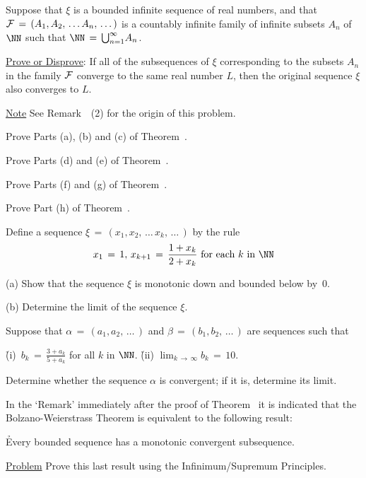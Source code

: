 \V
\V

\noindent \ExCn Suppose that ${\xi}$ is a bounded infinite sequence of real numbers, and that ${\cal F} \,=\, (A_{1},A_{2},\,{\ldots}\,A_{n},\,{\ldots}\,)$ is a countably infinite family of infinite subsets $A_{n}$ of ${\NN}$ such that ${\NN} \,=\, {\bigcup}_{n=1}^{{\infty}} A_{n}$.

        \underline{Prove or Disprove}: If all of the subsequences of ${\xi}$ corresponding to the subsets $A_{n}$ in the family ${\cal F}$ converge to the same real number $L$, then the original sequence ${\xi}$ also converges to $L$.

        \underline{Note} See Remark~~(2) for the origin of this problem.


\V
\V

\noindent \ExCo Prove Parts (a), (b) and (c) of Theorem~. %

\V
\V

\noindent \ExCp Prove Parts (d) and (e) of Theorem~. %

\V
\V

\noindent \ExCq Prove Parts (f) and (g) of Theorem~. %

\V
\V

\noindent \ExCr Prove Part (h) of Theorem~. %

\V
\V

\noindent \ExCs Define a sequence ${\xi} \,=\, (x_{1},x_{2},\,{\ldots}\,x_{k},\,{\ldots}\,)$ by the rule
        \begin{displaymath}
        x_{1} \,=\, 1, \, x_{k+1} \,=\, \frac{1+x_{k}}{2+x_{k}} \mbox{ for each $k$ in ${\NN}$}
        \end{displaymath}

\V

        (a) Show that the sequence ${\xi}$ is monotonic down and bounded below by~$0$.

\V

        (b) Determine the limit of the sequence ${\xi}$.


\V
\V

\noindent \ExCt Suppose that ${\alpha} \,=\, (a_{1},a_{2},\,{\ldots}\,)$ and ${\beta} \,=\, (b_{1},b_{2},\,{\ldots}\,)$ are sequences such that

        \h (i)\, $b_{k} \,=\, {\displaystyle \frac{3+a_{k}}{5+a_{k}}}$ for all $k$ in ${\NN}$.
        \h (ii) $\lim_{k \,{\rightarrow}\, {\infty}} b_{k} \,=\, 10$.

\noindent Determine whether the sequence ${\alpha}$ is convergent; if it is, determine its limit.

\V
\V


\noindent \ExCu In the `Remark' immediately after the proof of Theorem~ %
    it is indicated that the Bolzano-Weierstrass Theorem is equivalent to the following result:

        \h  Every bounded sequence has a monotonic convergent subsequence.

        \underline{Problem} Prove this last result using the Infinimum/Supremum Principles.


